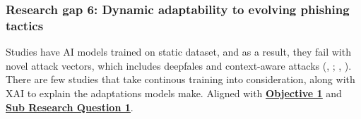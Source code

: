 
\subsubsection*{Research gap 6: Dynamic adaptability to evolving phishing tactics}\label{research-gap-6}
Studies have AI models trained on static dataset, and as a result, they fail with novel attack vectors, which includes deepfales and context-aware attacks (\citeauthor{kapoor2024comparative}, \citeyear{kapoor2024comparative}; \citeauthor{atlam2022business}, \citeyear{atlam2022business}). There are few studies that take continous training into consideration, along with XAI to explain the adaptations models make. Aligned with \hyperref[objective-1]{\uline{\textbf{Objective 1}}} and \hyperref[sub-research-q1]{\uline{\textbf{Sub Research Question 1}}}.

